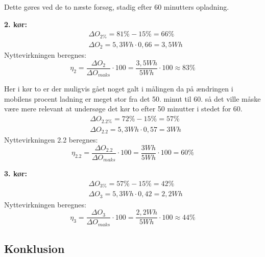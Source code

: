 Dette gøres ved de to næste forsøg, stadig efter 60 minutters opladning.

\textbf{2. kør:}
\begin{align*}
& \Delta O_{2\%} = 81\%-15\% =  66\%  \\
& \Delta O_2 = 5,3 Wh \cdot 0,66 = 3,5 Wh
\end{align*}
Nyttevirkningen beregnes:
\begin{equation}
\eta_2 = \frac{\Delta O_2}{\Delta O_{maks}} \cdot 100 = \frac{3,5 Wh}{5 Wh} \cdot 100 \approx 83 \%
\end{equation}

Her i kør to er der muligvis gået noget galt i målingen da på ændringen i mobilens procent ladning er meget stor fra det 50. minut til 60. så det ville måske være mere relevant at undersøge det kør to efter 50 minutter i stedet for 60.
\begin{align*}
& \Delta O_{2.2\%} = 72\%-15\% =  57\%  \\
& \Delta O_{2.2} = 5,3 Wh \cdot 0,57 = 3 Wh
\end{align*}
Nyttevirkningen 2.2 beregnes:
\begin{equation}
\eta_{2.2} = \frac{\Delta O_{2.2}}{\Delta O_{maks}} \cdot 100 = \frac{3 Wh}{5 Wh} \cdot 100 = 60 \%
\end{equation}

\textbf{3. kør:}
\begin{align*}
& \Delta O_{3\%} = 57\%-15\% =  42\%  \\
& \Delta O_3 = 5,3 Wh \cdot 0,42 = 2,2 Wh
\end{align*}
Nyttevirkningen beregnes:
\begin{equation}
\eta_3 = \frac{\Delta O_3}{\Delta O_{maks}} \cdot 100 = \frac{2,2 Wh}{5 Wh} \cdot 100 \approx 44 \%
\end{equation}

\subsection{Konklusion}
